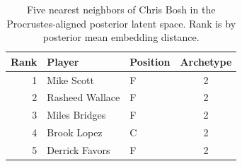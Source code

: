 \begin{table}[htbp]
  \centering\small
  \begin{tabular}{rllc}
    \toprule
    Rank & Player & Position & Archetype \\
    \midrule
    1 & Mike Scott & F & 2 \\
    2 & Rasheed Wallace & F & 2 \\
    3 & Miles Bridges & F & 2 \\
    4 & Brook Lopez & C & 2 \\
    5 & Derrick Favors & F & 2 \\
    \bottomrule
  \end{tabular}
  \caption{Five nearest neighbors of Chris Bosh in the Procrustes-aligned posterior latent space. Rank is by posterior mean embedding distance.}
  \label{tab:Chris_Bosh_neighbors}
\end{table}

